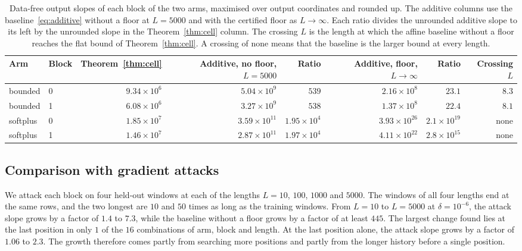 \documentclass[11pt, a4paper]{article}
\theoremstyle{remark}
\theoremstyle{plain}
\begin{document}
\begin{table}[htbp]
\centering
\small
\setlength{\tabcolsep}{4pt}
\begin{tabular}{@{}llrrrrrr@{}}
\toprule
Arm & Block & Theorem~\ref{thm:cell} & \shortstack{Additive, no floor,\\ $L = 5000$} & Ratio & \shortstack{Additive, floor,\\ $L \to \infty$} & Ratio & \shortstack{Crossing\\ $L$} \\
\midrule
bounded  & 0 & $9.34 \times 10^{6}$ & $5.04 \times 10^{9}$  & $539$                & $2.16 \times 10^{8}$  & $23.1$               & $8.3$ \\
bounded  & 1 & $6.08 \times 10^{6}$ & $3.27 \times 10^{9}$  & $538$                & $1.37 \times 10^{8}$  & $22.4$               & $8.1$ \\
softplus & 0 & $1.85 \times 10^{7}$ & $3.59 \times 10^{11}$ & $1.95 \times 10^{4}$ & $3.93 \times 10^{26}$ & $2.1 \times 10^{19}$ & none \\
softplus & 1 & $1.46 \times 10^{7}$ & $2.87 \times 10^{11}$ & $1.97 \times 10^{4}$ & $4.11 \times 10^{22}$ & $2.8 \times 10^{15}$ & none \\
\bottomrule
\end{tabular}
\caption{Data-free output slopes of each block of the two arms, maximised over output coordinates
  and rounded up. The additive columns use the baseline~\eqref{eq:additive} without a floor at
  $L = 5000$ and with the certified floor as $L \to \infty$. Each ratio divides the unrounded
  additive slope to its left by the unrounded slope in the Theorem~\ref{thm:cell} column. The
  crossing $L$ is the length at which the affine baseline without a floor reaches the flat bound
  of Theorem~\ref{thm:cell}. A crossing of none means that the baseline is the larger bound at every length.}
\label{tab:incremental}
\end{table}

\subsection{Comparison with gradient attacks}
\label{sec:sens-experiments}

We attack each block on four held-out windows at each of the lengths $L = 10$, $100$, $1000$ and
$5000$. The windows of all four lengths end at the same rows, and the two longest are $10$ and
$50$ times as long as the training windows. From $L = 10$ to
$L = 5000$ at $\delta = 10^{-6}$, the attack slope grows by a factor of $1.4$ to $7.3$, while the
baseline without a floor grows by a factor of at least $445$. The largest change found lies at the
last position in only $1$ of the $16$ combinations of arm, block and length. At the last position
alone, the attack slope grows by a factor of $1.06$ to $2.3$. The growth
therefore comes partly from searching more positions and partly from the longer history before a
single position.
\end{document}
